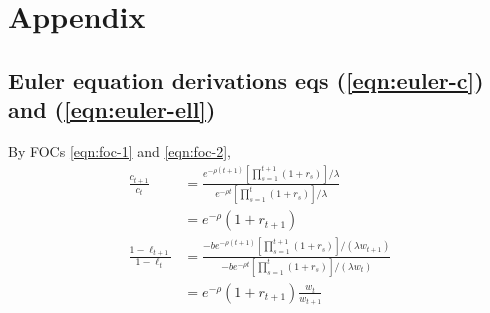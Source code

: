 \documentclass[../main.tex]{subfiles}
\begin{document}
        
        
        




    \renewcommand{\thesection}{A\arabic{chapter}}
    
    \newpage
    \section{Appendix}
    
    \subsection{Euler equation derivations eqs (\ref{eqn:euler-c}) and (\ref{eqn:euler-ell})}\label{app:euler-c-ell}
        
        By FOCs \eqref{eqn:foc-1} and \eqref{eqn:foc-2},
        \begin{align}
            \frac{c_{t+1}}{c_t}
            &= \frac{
                e^{-\rho (t+1)} \left[\prod_{s=1}^{t+1}(1+r_s)\right] / \lambda
                }{
                e^{-\rho t}
                \left[\prod_{s=1}^{t}(1+r_s)\right] / \lambda}
            \\
            &= e^{-\rho}(1+r_{t+1})
            \\
            \frac{1-\ell_{t+1}}{1-\ell_t}
            &= \frac{
                    - b e^{-\rho (t+1)}
                    \left[\prod_{s=1}^{t+1}(1+r_s)\right] / (\lambda w_{t+1})
                    }{
                    - b e^{-\rho t}
                    \left[\prod_{s=1}^{t}(1+r_s)\right] / (\lambda w_t)
                }
            \\
            &= e^{-\rho}(1+r_{t+1})\frac{w_t}{w_{t+1}}
        \end{align}
    
\end{document}

